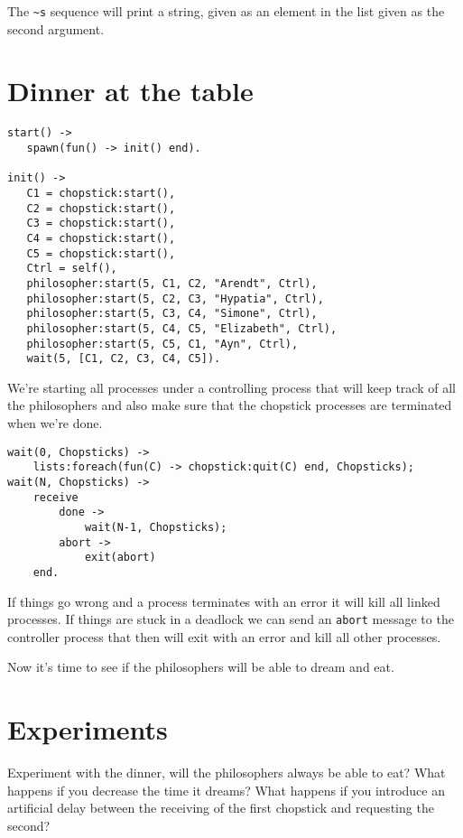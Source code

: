 \documentclass[a4paper,11pt]{article}
\begin{document}
The {\tt \textasciitilde s} sequence will print a string, given as an
element in the list given as the second argument.

\section{Dinner at the table}

 

\begin{verbatim}
start() ->
   spawn(fun() -> init() end).

init() ->
   C1 = chopstick:start(),
   C2 = chopstick:start(),
   C3 = chopstick:start(),
   C4 = chopstick:start(),
   C5 = chopstick:start(),
   Ctrl = self(),
   philosopher:start(5, C1, C2, "Arendt", Ctrl),
   philosopher:start(5, C2, C3, "Hypatia", Ctrl),
   philosopher:start(5, C3, C4, "Simone", Ctrl),
   philosopher:start(5, C4, C5, "Elizabeth", Ctrl),
   philosopher:start(5, C5, C1, "Ayn", Ctrl),
   wait(5, [C1, C2, C3, C4, C5]).
\end{verbatim}

We're starting all processes under a controlling process that will keep
track of all the philosophers and also make sure that the chopstick
processes are terminated when we're done. 

\begin{verbatim}
wait(0, Chopsticks) ->
    lists:foreach(fun(C) -> chopstick:quit(C) end, Chopsticks);
wait(N, Chopsticks) ->
    receive
        done ->
            wait(N-1, Chopsticks);
        abort ->
            exit(abort)
    end.
\end{verbatim}

If things go wrong and a process terminates with an error it will kill
all linked processes. If things are stuck in a deadlock we can send
an {\tt abort} message to the controller process that then will exit
with an error and kill all other processes.

Now it's time to see if the philosophers will be able to dream and eat. 

\section{Experiments}

Experiment with the dinner, will the philosophers always be able to
eat? What happens if you decrease the time it dreams? What happens if
you introduce an artificial delay between the receiving of the first
chopstick and requesting the second?
\end{document}
